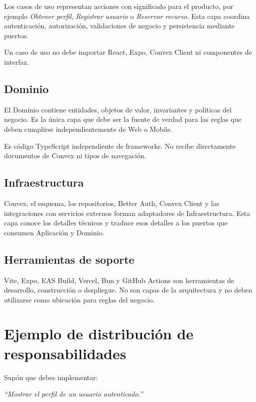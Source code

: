 \documentclass[11pt,a4paper]{article}
\begin{document}
Los casos de uso representan acciones con significado para el producto, por
ejemplo \textit{Obtener perfil}, \textit{Registrar usuario} o
\textit{Reservar recurso}. Esta capa coordina autenticación, autorización,
validaciones de negocio y persistencia mediante puertos.

Un caso de uso no debe importar React, Expo, Convex Client ni componentes de
interfaz.

\subsection*{Dominio}

El Dominio contiene entidades, objetos de valor, invariantes y políticas del
negocio. Es la única capa que debe ser la fuente de verdad para las reglas que
deben cumplirse independientemente de Web o Mobile.

Es código TypeScript independiente de frameworks. No recibe directamente
documentos de Convex ni tipos de navegación.

\subsection*{Infraestructura}

Convex, el esquema, los repositorios, Better Auth, Convex Client y las
integraciones con servicios externos forman adaptadores de Infraestructura.
Esta capa conoce los detalles técnicos y traduce esos detalles a los puertos
que consumen Aplicación y Dominio.

\subsection*{Herramientas de soporte}

Vite, Expo, EAS Build, Vercel, Bun y GitHub Actions son herramientas de
desarrollo, construcción o despliegue. No son capas de la arquitectura y no
deben utilizarse como ubicación para reglas del negocio.

\section{Ejemplo de distribución de responsabilidades}

Supón que debes implementar:

\begin{center}
  \textit{``Mostrar el perfil de un usuario autenticado.''}
\end{center}
\end{document}
